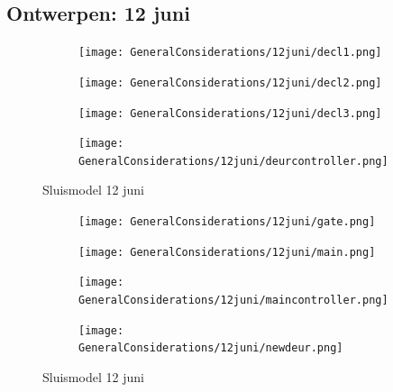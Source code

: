 \documentclass{article}
\begin{document}
	\newpage
	\subsection{Ontwerpen: 12 juni}
	
	
	
	
	\begin{figure}
		\centering
		\begin{subfigure}{0.45\linewidth}
			\texttt{[image: GeneralConsiderations/12juni/decl1.png]}
			\caption{}
			\label{fig:1a}
		\end{subfigure}\hfill
		\begin{subfigure}{0.45\linewidth}
			\texttt{[image: GeneralConsiderations/12juni/decl2.png]}
			\caption{}
			\label{fig:1a}
		\end{subfigure}
		
		\begin{subfigure}{0.45\linewidth}
			\texttt{[image: GeneralConsiderations/12juni/decl3.png]}
			\caption{}
			\label{fig:1a}
		\end{subfigure}\hfill
		\begin{subfigure}{0.45\linewidth}
			\texttt{[image: GeneralConsiderations/12juni/deurcontroller.png]}
			\caption{}
			\label{fig:1a}
		\end{subfigure}
		\caption{Sluismodel 12 juni}
		\label{fig:1}
	\end{figure}
	\begin{figure}
		\centering
		\begin{subfigure}{0.45\linewidth}
			\texttt{[image: GeneralConsiderations/12juni/gate.png]}
			\caption{}
			\label{fig:1a}
		\end{subfigure}\hfill
		\begin{subfigure}{0.45\linewidth}
			\texttt{[image: GeneralConsiderations/12juni/main.png]}
			\caption{}
			\label{fig:1a}
		\end{subfigure}
		
		\begin{subfigure}{0.45\linewidth}
			\texttt{[image: GeneralConsiderations/12juni/maincontroller.png]}
			\caption{}
			\label{fig:1a}
		\end{subfigure}\hfill
		\begin{subfigure}{0.45\linewidth}
			\texttt{[image: GeneralConsiderations/12juni/newdeur.png]}
			\caption{}
			\label{fig:1a}
		\end{subfigure}
		\caption{Sluismodel 12 juni}
		\label{fig:1}
	\end{figure}
\end{document}
